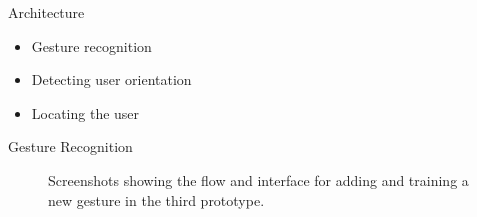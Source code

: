 \begin{frame}{Architecture}{}
\centering
\begin{itemize}
    \item Gesture recognition
    \item Detecting user orientation
    \item Locating the user
\end{itemize}
\end{frame}


\begin{frame}{Gesture Recognition}{}
\centering
\begin{figure}
    \caption{Screenshots showing the flow and interface for adding and training a new gesture in the third prototype.}
\label{fig:prototype3-gesture-screenshots}
\end{figure}
\end{frame}

